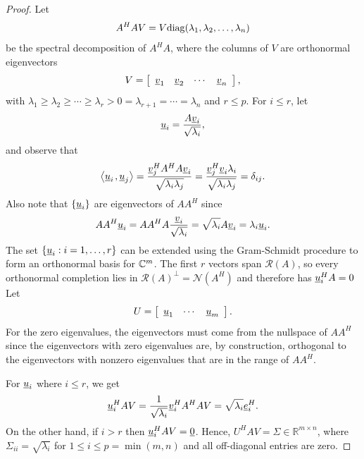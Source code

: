 \begin{proof}
Let
\begin{equation*}
A^H A V = V \mathrm{diag} ( \lambda_1, \lambda_2, \ldots, \lambda_n )
\end{equation*}
be the spectral decomposition of $A^H A$, where the columns of $V$ are orthonormal eigenvectors
\begin{equation*}
V = \left[ \begin{array}{cccc} \underline{v}_1 & \underline{v}_2 & \cdots & \underline{v}_n \end{array} \right], 
\end{equation*}
with $\lambda_1 \geq \lambda_2 \geq \cdots \geq \lambda_r > 0 = \lambda_{r+1} = \cdots = \lambda_{n}$ and $r \leq p$.
For $i \leq r$, let
\begin{equation*}
\underline{u}_i = \frac{A \underline{v}_i}{\sqrt{\lambda_i}},
\end{equation*}
and observe that
\begin{equation*}
{\left\langle  \underline{u}_i  \mskip2mu ,  \underline{u}_j  \right\rangle}
= \frac{\underline{v}_j^H A^H A \underline{v}_i}{\sqrt{\lambda_i \lambda_j}}
= \frac{\underline{v}_j^H \underline{v}_i \lambda_i}{\sqrt{\lambda_i \lambda_j}}
= \delta_{ij} .
\end{equation*}
Also note that $\{ \underline{u}_i \}$ are eigenvectors of $A A^H$ since
\begin{equation*}
A A^H \underline{u}_i
= A A^H A \frac{\underline{v}_i}{\sqrt{\lambda_i}}
= \sqrt{\lambda_i} A \underline{v}_i
= \lambda_i \underline{u}_i .
\end{equation*}
The set $\left\{ \underline{u}_i: i = 1, \ldots, r \right\}$ can be extended using the Gram-Schmidt procedure to form an orthonormal basis for $\mathbb{C}^m$.
The first $r$ vectors span $\mathcal R(A)$, so every orthonormal completion lies in $\mathcal R(A)^\bot=\mathcal N(A^H)$ and therefore has $\underline u_i^HA=0$
Let
\begin{equation*}
U = \left[ \begin{array}{ccc} \underline{u}_1 & \cdots & \underline{u}_m \end{array} \right] .
\end{equation*}
For the zero eigenvalues, the eigenvectors must come from the nullspace of $A A^H$ since the eigenvectors with zero eigenvalues are, by construction, orthogonal to the eigenvectors with nonzero eigenvalues that are in the range of $A A^H$.

For $\underline{u}_i$ where $i \leq r$, we get
\begin{equation*}
\underline{u}_i^H A V 
= \frac{1}{\sqrt{\lambda_i}} \underline{v}_i^H A^H A V
= \sqrt{\lambda_i} \underline{e}_i^H .
\end{equation*}
On the other hand, if $i > r$ then $\underline{u}_i^H A V = \underline{0}$.
Hence, $U^HAV=\Sigma\in\mathbb R^{m\times n}$, where $\Sigma_{ii}=\sqrt{\lambda_i}$ for $1\le i\le p=\min(m,n)$ and all off-diagonal entries are zero.


\end{proof}
